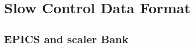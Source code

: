 \documentclass{desyproc}
\begin{document}
\section{Slow Control Data Format}


\subsection{EPICS and scaler Bank}







\end{document}
